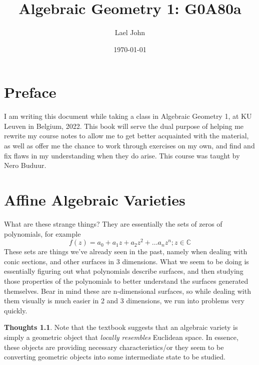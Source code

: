 \documentclass[12pt]{book}
\date{\today}
\title{Algebraic Geometry 1: G0A80a}
\author{Lael John}
\theoremstyle{definition}
\newtheorem*{huh}{Thoughts}
\begin{document}
\maketitle
\chapter*{Preface}
I am writing this document while taking a class in Algebraic Geometry 1, at KU Leuven in Belgium, 2022. This book will serve the dual purpose of helping me rewrite my course notes to allow me to get better acquainted with the material, as well as offer me the chance to work through exercises on my own, and find and fix flaws in my understanding when they do arise. This course was taught by Nero Buduur. 
\tableofcontents
\chapter{Affine Algebraic Varieties}
What are these strange things? They are essentially the sets of zeros of polynomials, for example
$$f(z) = a_0 + a_1z + a_2z^2 + \ldots a_nz^n; z \in \mathbb{C}$$
These sets are things we've already seen in the past, namely when dealing with conic sections, and other surfaces in 3 dimensions. What we seem to be doing is essentially figuring out what polynomials describe surfaces, and then studying those properties of the polynomials to better understand the surfaces generated themselves. Bear in mind these are n-dimensional surfaces, so while dealing with them visually is much easier in 2 and 3 dimensions, we run into problems very quickly. 

\begin{huh}
Note that the textbook suggests that an algebraic variety is simply a geometric object that \textit{locally resembles} Euclidean space. In essence, these objects are providing necessary characteristics/or they seem to be converting geometric objects into some intermediate state to be studied. 
\end{huh}
\end{document}
